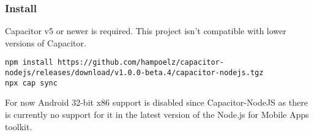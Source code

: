 \subsubsection{Install}
\label{sec:Capacitor-NodeJS:Install}

Capacitor v5 or newer is required. This project isn't compatible with lower versions of Capacitor.

\begin{verbatim}
npm install https://github.com/hampoelz/capacitor-nodejs/releases/download/v1.0.0-beta.4/capacitor-nodejs.tgz
npx cap sync
\end{verbatim}

\begin{note}[Note]
  For now Android 32-bit x86 support is disabled since Capacitor-NodeJS  as there is currently no support for it in the latest version of the Node.js for Mobile Apps toolkit.
  \cite{nodejs-mobile}
\end{note}
